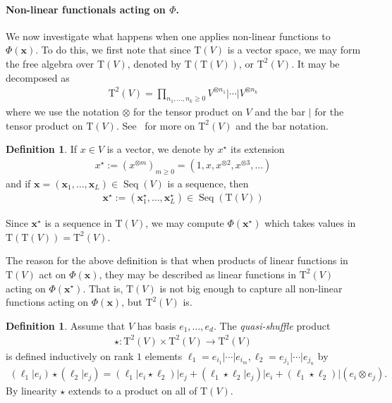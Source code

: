\documentclass{article} \usepackage{iclr2021_conference,times}
\newcommand{\bx}{\mathbf{x}}
\newcommand{\T}[1]{\mathrm{T}({#1})}
\newcommand{\Tra}[2]{\mathrm{T}^{{#1}}({#2})}
\newcommand{\Seq}[1]{\operatorname{Seq}(#1)}
\theoremstyle{plain}
\theoremstyle{definition}
\newtheorem{definition}[thm]{Definition}
\begin{document}
	\paragraph{Non-linear functionals acting on $ \Phi $.} We now investigate what happens when one applies non-linear functions to $ \Phi(\bx) $. To do this, we first note that since $ \T{V} $ is a vector space, we may form the free algebra over $ \T{V} $, denoted by $ \T{\T{V}} $, or $ \Tra{2}{V} $. It may be decomposed as 
	\begin{align}
	\Tra{2}{V} = \prod_{n_1, \ldots, n_k \geq 0} V^{\otimes n_1} \big\vert \cdots \big\vert V^{\otimes n_k}
	\end{align}
	where we use the notation $ \otimes $ for the tensor product on $ V $ and the bar $ \vert $ for the tensor product on $ \T{V} $. See~\citet{Ebrahimi15} for more on $ \Tra{2}{V} $ and the bar notation. 
	
	\begin{definition}
		If $ x \in V $ is a vector, we denote by $ x^\star $ its extension 
		\begin{align}
		x^\star := (x^{\otimes m})_{m\geq 0} = (1, x, x^{\otimes 2}, x^{\otimes 3}, \ldots )
		\end{align}
		and if $ \bx = (\bx_1, \ldots, \bx_L) \in \Seq{V} $ is a sequence, then 
		\begin{align}
		\bx^\star := (\bx_1^\star, \ldots, \bx_L^\star) \in \Seq{\T{V}}
		\end{align}
	\end{definition}


	Since $ \bx^\star $ is a sequence in $ \T{V} $, we may compute $ \Phi(\bx^\star) $ which takes values in $ \T{\T{V}} = \Tra{2}{V} $.

	The reason for the above definition is that when products of linear functions in $ \T{V} $ act on $ \Phi(\bx) $, they may be described as linear functions in $ \Tra{2}{V} $ acting on $ \Phi(\bx^\star) $. That is, $ \T{V} $ is not big enough to capture all non-linear functions acting on $ \Phi(\bx) $, but $ \Tra{2}{V} $ is.
	


	\begin{definition}
		Assume that $ V $ has basis $ e_1, \ldots, e_d $. The \emph{quasi-shuffle} product 
		\begin{align}
		\star : \Tra{2}{V} \times \Tra{2}{V} \to \Tra{2}{V}
		\end{align}
		is defined inductively on rank $ 1 $ elements $ \ell_1 = e_{i_1} \vert \cdots \vert e_{i_m}, \ell_2 = e_{j_1} \vert \cdots \vert e_{j_n} $ by
		\begin{align}
		(\ell_1 \vert e_i)\star(\ell_2 \vert e_j) = (\ell_1 \vert e_i\star \ell_2)\vert e_j + (\ell_1\star \ell_2 \vert e_j)\vert e_i + (\ell_1\star \ell_2)\vert(e_i\otimes e_j).
		\end{align}
		By linearity $ \star $ extends to a product on all of $ \T{V} $.
	\end{definition}
\end{document}
